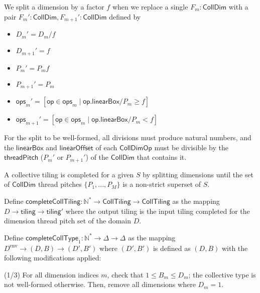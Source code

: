 \filbreak
We split a dimension by a factor $f$ when we replace a single $F_m: \mathsf{CollDim}$ with a pair $F_m': \mathsf{CollDim}, F_{m+1}': \mathsf{CollDim}$ defined by
\begin{itemize}
  \item $D_m' = D_m / f$
  \filbreak
  \item $D_{m+1}' = f$
  \filbreak
  \item $P_m' = P_m f$
  \filbreak
  \item $P_{m+1}' = P_m$
  \filbreak
  \item $\mathsf{ops}_m' = [\mathsf{op} \in \mathsf{ops}_m \mid \mathsf{op.linearBox} / P_m \ge f]$
  \filbreak
  \item $\mathsf{ops}_{m+1}' = [\mathsf{op} \in \mathsf{ops}_m \mid \mathsf{op.linearBox} / P_m < f]$
\end{itemize}
\filbreak
For the split to be well-formed, all divisions must produce natural numbers, and the $\mathsf{linearBox}$ and $\mathsf{linearOffset}$ of each $\mathsf{CollDimOp}$ must be divisible by the $\mathsf{threadPitch}$ ($P_m'$ or $P_{m+1}'$) of the $\mathsf{CollDim}$ that contains it.

\filbreak
A collective tiling is completed for a given  $S$ by splitting dimensions until the set of $\mathsf{CollDim}$ thread pitches $\{P_1, ..., P_M\}$ is a non-strict superset of $S$.

\filbreak
Define $\mathsf{completeCollTiling}: \mathbb{N}^* \to \mathsf{CollTiling} \to \mathsf{CollTiling}$ as the mapping $D \to \mathsf{tiling} \to \mathsf{tiling}'$ where the output tiling is the input tiling completed for the dimension thread pitch set of the domain $D$.

\filbreak
{}

Define  $\mathsf{completeCollType}_1: \mathbb{N}^* \to \Delta \to \Delta$ as the mapping $D^\text{env} \to (D, B) \to (D', B')$ where $(D', B')$ is defined as $(D, B)$ with the following modifications applied:

\filbreak
(1/3) For all dimension indices $m$, check that $1 \le B_m \le D_m$; the collective type is not well-formed otherwise.
Then, remove all dimensions where $D_m = 1$.

